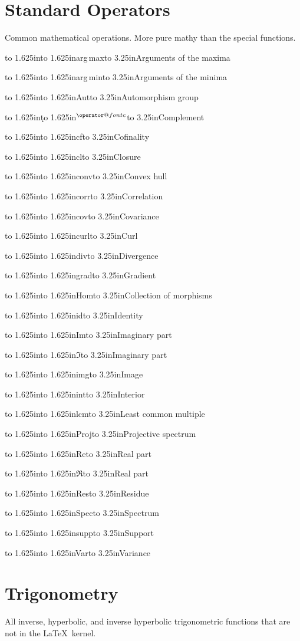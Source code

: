 \documentclass[12pt,twoside]{article}
\def\showop#1#2#3{\noindent
  \hbox to 1.625in{\texttt{\string#1}\hfil}\hbox to 1.625in{#2\hfil}\hbox to 3.25in{#3\hfil}%
  \par}
\begin{document}
\section{Standard Operators}{Common mathematical operations. More pure mathy than the special functions.}

\showop{\argmax}{arg$\,$max}{Arguments of the maxima}
\showop{\argmin}{arg$\,$min}{Arguments of the minima}
\showop{\Aut}{Aut}{Automorphism group}
\showop{\c}{$^{\begingroup\operator@font c\endgroup}$}{Complement\footnotemark}
\showop{\cf}{cf}{Cofinality}
\showop{\cl}{cl}{Closure}
\showop{\conv}{conv}{Convex hull}
\showop{\corr}{corr}{Correlation}
\showop{\cov}{cov}{Covariance}
\showop{\curl}{curl}{Curl}
\showop{\divop}{div}{Divergence}
\showop{\grad}{grad}{Gradient}
\showop{\Hom}{Hom}{Collection of morphisms}
\showop{\id}{id}{Identity}
\showop{\Im}{Im}{Imaginary part}
\showop{\varIm}{$\Im$}{Imaginary part\footnotemark}
\showop{\img}{img}{Image}
\showop{\interior}{int}{Interior}
\showop{\lcm}{lcm}{Least common multiple}
\showop{\Proj}{Proj}{Projective spectrum}
\showop{\Re}{Re}{Real part}
\showop{\varRe}{$\Re$}{Real part\footnotemark}
\showop{\Res}{Res}{Residue}
\showop{\Spec}{Spec}{Spectrum}
\showop{\supp}{supp}{Support}
\showop{\Var}{Var}{Variance}

\section{Trigonometry}{All inverse, hyperbolic, and inverse hyperbolic trigonometric functions that are not in the \LaTeX\ kernel.}
\end{document}
